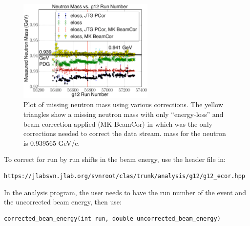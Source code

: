 \begin{figure}\begin{center}
\includegraphics[width=0.6\textwidth]{figures/calib/tag/ecor/C3pi_allcorr_neutron_rxr.eps}
\caption[Corrected Missing Neutron Mass for  Using Beam Corrections]{\label{fig:neutron.fixall} Plot of missing neutron mass using various corrections. The yellow triangles show a missing neutron mass with only ``energy-loss'' and beam correction applied (MK BeamCor) in which was the only corrections needed to correct the  data stream.  mass for the neutron is 0.939565 GeV/c.}
\end{center}\end{figure}



To correct for run by run shifts in the beam energy, use the header file in:
\begin{verbatim}
https://jlabsvn.jlab.org/svnroot/clas/trunk/analysis/g12/g12_ecor.hpp
\end{verbatim}

In the analysis program, the user needs to have the run number of the event and the uncorrected beam energy, then use:
\begin{verbatim}
corrected_beam_energy(int run, double uncorrected_beam_energy)
\end{verbatim}


\FloatBarrier
